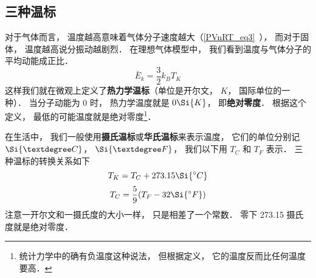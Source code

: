 

\subsection{三种温标}
对于气体而言， 温度越高意味着气体分子速度越大（\autoref{PVnRT_eq3}~）， 而对于固体， 温度越高说分振动越剧烈． 在理想气体模型中， 我们看到温度与气体分子的平均动能成正比． 
\begin{equation}
\bar E_k = \frac{3}{2} k_B T_K
\end{equation}
这样我们就在微观上定义了\textbf{热力学温标}（单位是开尔文， $K$， 国际单位的一种）． 当分子动能为 0 时， 热力学温度就是 $0 \Si{K}$， 即\textbf{绝对零度}． 根据这个定义， 最低的可能温度就是绝对零度\footnote{统计力学中的确有负温度这种说法， 但根据定义， 它的温度反而比任何温度要高．}．

在生活中， 我们一般使用\textbf{摄氏温标}或\textbf{华氏温标}来表示温度， 它们的单位分别记 $\Si{°C}$， $\Si{°F}$， 我们以下用 $T_C$ 和 $T_F$ 表示． 三种温标的转换关系如下
\begin{equation}
T_K = T_C + 273.15\Si{^\circ C}
\end{equation}
\begin{equation}
T_C = \frac{5}{9}(T_F - 32 \Si{^\circ F})
\end{equation}
注意一开尔文和一摄氏度的大小一样， 只是相差了一个常数． 零下 273.15 摄氏度就是绝对零度．
